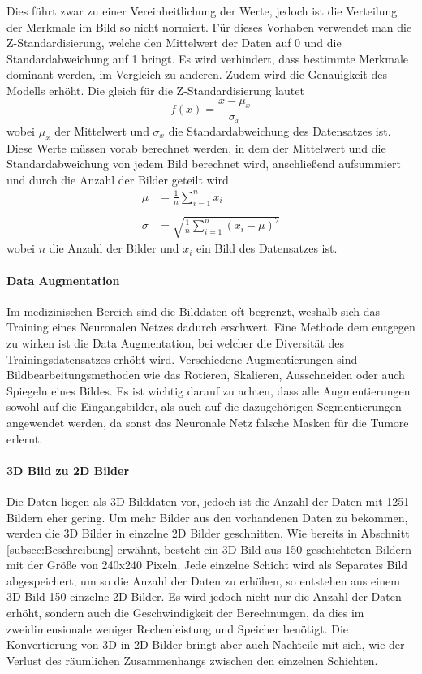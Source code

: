 Dies führt zwar zu einer Vereinheitlichung der Werte, jedoch ist die Verteilung der Merkmale im Bild so nicht normiert. Für dieses Vorhaben verwendet man die Z-Standardisierung, welche den Mittelwert der Daten auf 0 und die Standardabweichung auf 1 bringt. Es wird verhindert, dass bestimmte Merkmale dominant werden, im Vergleich zu anderen. Zudem wird die Genauigkeit des \glspl{Modell} erhöht.\cite[vgl.][]{Goodfellow2016} Die gleich für die Z-Standardisierung lautet
\begin{equation}
	f(x)=\frac{x - \mu_x}{\sigma_x}
\end{equation}
wobei $\mu_x$ der Mittelwert und $\sigma_x$ die Standardabweichung des Datensatzes ist. Diese Werte müssen vorab berechnet werden, in dem der Mittelwert und die Standardabweichung von jedem Bild berechnet wird, anschließend aufsummiert und durch die Anzahl der Bilder geteilt wird
\begin{equation}
	\begin{aligned}
		\mu &= \frac{1}{n}\sum_{i=1}^{n}x_i \\ \\
		\sigma &= \sqrt{\frac{1}{n}\sum_{i=1}^{n}(x_i - \mu)^2}
	\end{aligned}
\end{equation}
wobei $n$ die Anzahl der Bilder und $x_i$ ein Bild des Datensatzes ist.

\paragraph{Data Augmentation} Im medizinischen Bereich sind die Bilddaten oft begrenzt, weshalb sich das Training eines Neuronalen Netzes dadurch erschwert. Eine Methode dem entgegen zu wirken ist die Data Augmentation, bei welcher die Diversität des Trainingsdatensatzes erhöht wird. Verschiedene Augmentierungen sind Bildbearbeitungsmethoden wie das Rotieren, Skalieren, Ausschneiden oder auch Spiegeln eines Bildes. Es ist wichtig darauf zu achten, dass alle Augmentierungen sowohl auf die Eingangsbilder, als auch auf die dazugehörigen Segmentierungen angewendet werden, da sonst das Neuronale Netz falsche Masken für die Tumore erlernt. \cite[vgl.][]{Shorten2019}

\paragraph{3D Bild zu 2D Bilder} Die Daten liegen als 3D Bilddaten vor, jedoch ist die Anzahl der Daten mit 1251 Bildern eher gering. Um mehr Bilder aus den vorhandenen Daten zu bekommen, werden die 3D Bilder in einzelne 2D Bilder geschnitten. Wie bereits in Abschnitt \ref{subsec:Beschreibung} erwähnt, besteht ein 3D Bild aus 150 geschichteten Bildern mit der Größe von 240x240 Pixeln. Jede einzelne Schicht wird als Separates Bild abgespeichert, um so die Anzahl der Daten zu erhöhen, so entstehen aus einem 3D Bild 150 einzelne 2D Bilder. Es wird jedoch nicht nur die Anzahl der Daten erhöht, sondern auch die Geschwindigkeit der Berechnungen, da dies im zweidimensionale weniger Rechenleistung und Speicher benötigt. Die Konvertierung von 3D in 2D Bilder bringt aber auch Nachteile mit sich, wie der Verlust des räumlichen Zusammenhangs zwischen den einzelnen Schichten. \cite[vgl.][]{Stevens2020}

